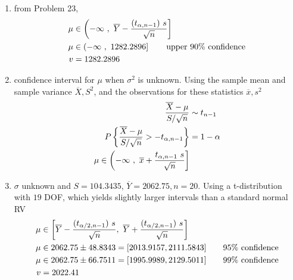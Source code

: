 \begin{enumerate}
	\item from Problem 23,\\
	\begin{subequations}
		\begin{align}
			\mu &\in \left(-\infty\ ,\  \overline{Y} - \frac{(t_{\alpha, n-1})\ s}{\sqrt{n}} \right] \nonumber \\
			\mu &\in \left(-\infty\ ,\ 1282.2896  \right] \qquad \text{upper 90\% confidence} \nonumber \\
			v &= 1282.2896
		\end{align}\\
	\end{subequations}
	
	\item confidence interval for $ \mu $ when $ \sigma^2 $ is unknown. Using the sample mean and sample variance $ \overline{X}, S^2 $, and the observations for these statistics $ \overline{x}, s^2 $\\
	\begin{subequations}
		\begin{align}
			\frac{\overline{X} - \mu}{S/\sqrt{n}} &\sim t_{n-1} \nonumber \\
			P \left\{ \frac{\overline{X} - \mu}{S/\sqrt{n}} > -t_{\alpha, n-1}\right\} &= 1 - \alpha \nonumber \\
			\mu \in \left( -\infty\ ,\ \overline{x} + \frac{t_{\alpha, n-1}\ s}{\sqrt{n}} \right]
		\end{align}\\
	\end{subequations}
	
	\item $ \sigma $ unknown and $ S = 104.3435 $, $ \overline{Y} = 2062.75, n = 20$. Using a t-distribution with $ 19 $ DOF, which yields slightly larger intervals than a standard normal RV\\
	\begin{subequations}
		\begin{align}
			\mu &\in \left[ \overline{Y} - \frac{(t_{\alpha/2, n-1})\ s}{\sqrt{n}}, \ \overline{Y} + \frac{(t_{\alpha/2, n-1})\ s}{\sqrt{n}} \right] \nonumber \\
			\mu &\in 2062.75 \pm 48.8343 = [2013.9157, 2111.5843] \qquad \text{95\% confidence} \nonumber \\
			\mu &\in 2062.75 \pm 66.7511 = [1995.9989, 2129.5011] \qquad \text{99\% confidence} \nonumber \\
			v &= 2022.41
		\end{align}\\
	\end{subequations}


\end{enumerate}
